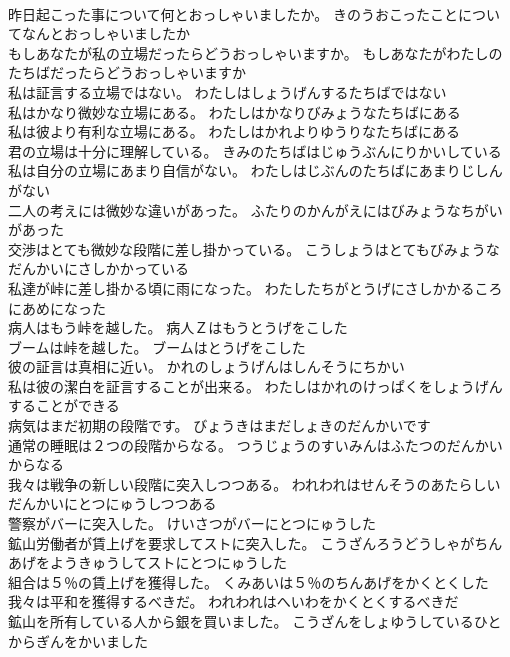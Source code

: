 \documentclass[8pt]{extreport}
\begin{document}
\begin{CJK}{UTF8}{min}
\\	昨日起こった事について何とおっしゃいましたか。	きのうおこったことについてなんとおっしゃいましたか 
\\	もしあなたが私の立場だったらどうおっしゃいますか。	もしあなたがわたしのたちばだったらどうおっしゃいますか 
\\	私は証言する立場ではない。	わたしはしょうげんするたちばではない 
\\	私はかなり微妙な立場にある。	わたしはかなりびみょうなたちばにある 
\\	私は彼より有利な立場にある。	わたしはかれよりゆうりなたちばにある 
\\	君の立場は十分に理解している。	きみのたちばはじゅうぶんにりかいしている 
\\	私は自分の立場にあまり自信がない。	わたしはじぶんのたちばにあまりじしんがない 
\\	二人の考えには微妙な違いがあった。	ふたりのかんがえにはびみょうなちがいがあった 
\\	交渉はとても微妙な段階に差し掛かっている。	こうしょうはとてもびみょうなだんかいにさしかかっている 
\\	私達が峠に差し掛かる頃に雨になった。	わたしたちがとうげにさしかかるころにあめになった 
\\	病人はもう峠を越した。	病人Ｚはもうとうげをこした 
\\	ブームは峠を越した。	ブームはとうげをこした 
\\	彼の証言は真相に近い。	かれのしょうげんはしんそうにちかい 
\\	私は彼の潔白を証言することが出来る。	わたしはかれのけっぱくをしょうげんすることができる 
\\	病気はまだ初期の段階です。	びょうきはまだしょきのだんかいです 
\\	通常の睡眠は２つの段階からなる。	つうじょうのすいみんはふたつのだんかいからなる 
\\	我々は戦争の新しい段階に突入しつつある。	われわれはせんそうのあたらしいだんかいにとつにゅうしつつある 
\\	警察がバーに突入した。	けいさつがバーにとつにゅうした 
\\	鉱山労働者が賃上げを要求してストに突入した。	こうざんろうどうしゃがちんあげをようきゅうしてストにとつにゅうした 
\\	組合は５％の賃上げを獲得した。	くみあいは５％のちんあげをかくとくした 
\\	我々は平和を獲得するべきだ。	われわれはへいわをかくとくするべきだ 
\\	鉱山を所有している人から銀を買いました。	こうざんをしょゆうしているひとからぎんをかいました 

\end{CJK}
\end{document}
